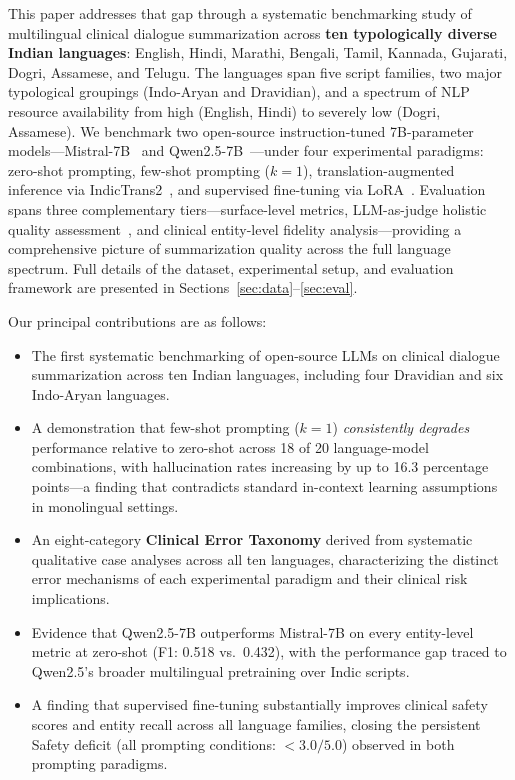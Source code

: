 \documentclass[10pt,twocolumn]{article}
\begin{document}
This paper addresses that gap through a systematic benchmarking
study of multilingual clinical dialogue summarization across
\textbf{ten typologically diverse Indian languages}: English,
Hindi, Marathi, Bengali, Tamil, Kannada, Gujarati,
Dogri, Assamese, and Telugu. The languages span five script
families, two major typological groupings (Indo-Aryan and
Dravidian), and a spectrum of NLP resource availability from
high (English, Hindi) to severely low (Dogri, Assamese).
We benchmark two open-source instruction-tuned 7B-parameter
models---Mistral-7B~\citep{jiang2023mistral} and
Qwen2.5-7B~\citep{qwen25}---under four experimental
paradigms: zero-shot prompting, few-shot prompting ($k{=}1$),
translation-augmented inference via
IndicTrans2~\citep{gala2023indictrans}, and supervised
fine-tuning via LoRA~\citep{hu2021lora}.
Evaluation spans three complementary tiers---surface-level
metrics, LLM-as-judge holistic quality
assessment~\citep{zheng2023judging}, and clinical entity-level
fidelity analysis---providing a comprehensive picture of
summarization quality across the full language spectrum.
Full details of the dataset, experimental setup, and
evaluation framework are presented in
Sections~\ref{sec:data}--\ref{sec:eval}.

Our principal contributions are as follows:

\begin{itemize}[leftmargin=*, topsep=2pt, itemsep=1pt]
  \item The first systematic benchmarking of open-source LLMs
    on clinical dialogue summarization across ten Indian languages,
    including four Dravidian and six Indo-Aryan languages.

  \item A demonstration that few-shot prompting ($k{=}1$)
    \textit{consistently degrades} performance relative to
    zero-shot across 18 of 20 language-model combinations,
    with hallucination rates increasing by up to 16.3 percentage
    points---a finding that contradicts standard in-context
    learning assumptions in monolingual settings.

  \item An eight-category \textbf{Clinical Error Taxonomy}
    derived from systematic qualitative case analyses across
    all ten languages, characterizing the distinct error
    mechanisms of each experimental paradigm and their
    clinical risk implications.

  \item Evidence that Qwen2.5-7B outperforms Mistral-7B on
    every entity-level metric at zero-shot (F1: 0.518 vs.\ 0.432),
    with the performance gap traced to Qwen2.5's broader
    multilingual pretraining over Indic scripts.

  \item A finding that supervised fine-tuning substantially
    improves clinical safety scores and entity recall across
    all language families, closing the persistent Safety deficit
    (all prompting conditions: $<3.0/5.0$) observed in both
    prompting paradigms.
\end{itemize}
\end{document}
